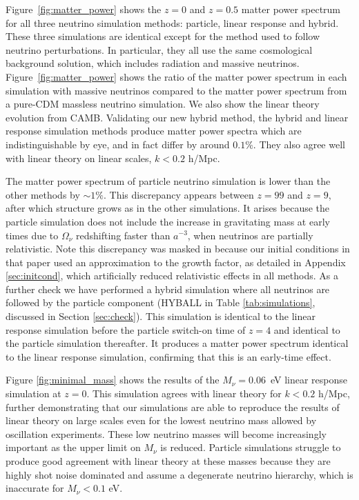\documentclass[useAMS, usenatbib]{mnras}
\begin{document}
Figure~\ref{fig:matter_power} shows the $z=0$ and $z=0.5$ matter power spectrum for all three neutrino simulation methods: particle, linear response and hybrid. These three simulations are identical except for the method used to follow neutrino perturbations. In particular, they all use the same cosmological background solution, which includes radiation and massive neutrinos. Figure~\ref{fig:matter_power} shows the ratio of the matter power spectrum in each simulation with massive neutrinos compared to the matter power spectrum from a pure-CDM massless neutrino simulation. We also show the linear theory evolution from CAMB. Validating our new hybrid method, the hybrid and linear response simulation methods produce matter power spectra which are indistinguishable by eye, and in fact differ by around $0.1\%$. They also agree well with linear theory on linear scales, $k < 0.2$ h/Mpc.

The matter power spectrum of particle neutrino simulation is lower than the other methods by $\sim 1\%$. This discrepancy appears between $z=99$ and $z=9$, after which structure grows as in the other simulations. It arises because the particle simulation does not include the increase in gravitating mass at early times due to $\Omega_\nu$ redshifting faster than $a^{-3}$, when neutrinos are partially relativistic. Note this discrepancy was masked in \cite{AHB} because our initial conditions in that paper used an approximation to the growth factor, as detailed in Appendix \ref{sec:initcond}, which artificially reduced relativistic effects in all methods. As a further check we have performed a hybrid simulation where all neutrinos are followed by the particle component (HYBALL in Table \ref{tab:simulations}, discussed in Section \ref{sec:check}). This simulation is identical to the linear response simulation before the particle switch-on time of $z=4$ and identical to the particle simulation thereafter. It produces a matter power spectrum identical to the linear response simulation, confirming that this is an early-time effect.

Figure \ref{fig:minimal_mass} shows the results of the $M_\nu = 0.06$~eV linear response simulation at $z=0$. This simulation agrees with linear theory for $k < 0.2$ h/Mpc, further demonstrating that our simulations are able to reproduce the results of linear theory on large scales even for the lowest neutrino mass allowed by oscillation experiments. These low neutrino masses will become increasingly important as the upper limit on $M_\nu$ is reduced. Particle simulations struggle to produce good agreement with linear theory at these masses because they are highly shot noise dominated and assume a degenerate neutrino hierarchy, which is inaccurate for $M_\nu < 0.1$ eV.
\end{document}
